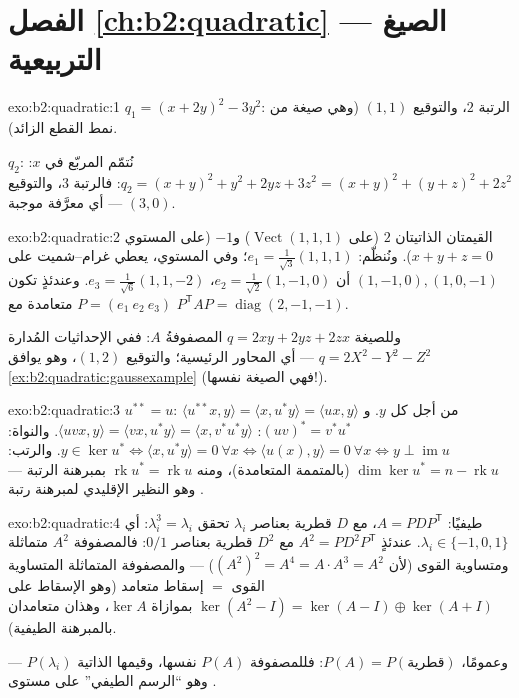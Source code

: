 \section*{الفصل \ref{ch:b2:quadratic} --- الصيغ التربيعية}

\begin{solution}{exo:b2:quadratic:1}
$q_1 = (x + 2y)^2 - 3y^2$: الرتبة $2$، والتوقيع $(1, 1)$ (وهي صيغة
من نمط القطع الزائد).

$q_2$: نُتمّم المربّع في $x$: $q_2 = (x + y)^2 + y^2 + 2yz +
3z^2 = (x+y)^2 + (y + z)^2 + 2z^2$: فالرتبة $3$، والتوقيع $(3, 0)$
--- أي معرَّفة موجبة.
\end{solution}

\begin{solution}{exo:b2:quadratic:2}
القيمتان الذاتيتان $2$ (على $\operatorname{Vect}(1,1,1)$) و$-1$ (على
المستوي $x + y + z = 0$). ونُنظّم: $e_1 =
\frac{1}{\sqrt3}(1,1,1)$؛ وفي المستوي، يعطي غرام--شميت على $(1,-1,0),
(1,0,-1)$ أن $e_2 = \frac{1}{\sqrt2}(1,-1,0)$، $e_3 =
\frac{1}{\sqrt6}(1,1,-2)$. وعندئذٍ تكون $P = (e_1\ e_2\ e_3)$ متعامدة
مع $P^{\mathsf T}AP = \operatorname{diag}(2,-1,-1)$.

وللصيغة $q = 2xy + 2yz + 2zx$ المصفوفةُ $A$: ففي الإحداثيات
المُدارة $q = 2X^2 - Y^2 - Z^2$ --- أي المحاور الرئيسية؛ والتوقيع
$(1,2)$، وهو يوافق \cref{ex:b2:quadratic:gaussexample}
(فهي الصيغة نفسها!).
\end{solution}

\begin{solution}{exo:b2:quadratic:3}
$u^{**} = u$: $\langle u^{**}x, y\rangle = \langle x, u^*y\rangle =
\langle ux, y\rangle$ من أجل كل $y$. و$(uv)^* = v^*u^*$: $\langle
uvx, y\rangle = \langle vx, u^*y\rangle = \langle x,
v^*u^*y\rangle$. والنواة: $y \in \ker u^* \iff \langle x, u^*y
\rangle = 0\ \forall x \iff \langle u(x), y\rangle = 0\ \forall x
\iff y \perp \operatorname{im} u$. والرتب: $\dim\ker u^* = n -
\operatorname{rk} u$ (بالمتممة المتعامدة)، ومنه
$\operatorname{rk} u^* = \operatorname{rk} u$ بمبرهنة الرتبة ---
وهو النظير الإقليدي لمبرهنة رتبة .
\end{solution}

\begin{solution}{exo:b2:quadratic:4}
طيفيًا: $A = PDP^{\mathsf T}$، مع $D$ قطرية بعناصر
$\lambda_i$ تحقق $\lambda_i^3 = \lambda_i$: أي $\lambda_i \in
\{-1, 0, 1\}$. عندئذٍ $A^2 = PD^2P^{\mathsf T}$ مع $D^2$ قطرية
بعناصر $0/1$: فالمصفوفة $A^2$ متماثلة ومتساوية القوى
(لأن $(A^2)^2 = A^4 = A\cdot A^3 = A^2$) --- والمصفوفة المتماثلة المتساوية القوى
$=$ إسقاط متعامد (وهو الإسقاط على
$\ker(A^2 - I) = \ker(A-I)\oplus\ker(A+I)$ بموازاة $\ker A$، وهذان
متعامدان بالمبرهنة الطيفية).

وعمومًا، $P(A) = P\!\left(\text{قطرية}\right)$: فللمصفوفة $P(A)$
 نفسها، وقيمها الذاتية $P(\lambda_i)$ --- وهو ``الرسم
الطيفي'' على مستوى .
\end{solution}

